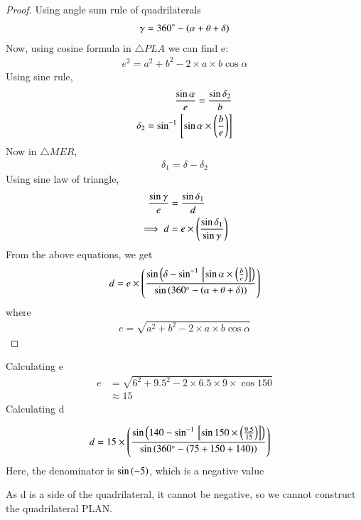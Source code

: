 \documentclass[journal,12pt,twocolumn]{IEEEtran}
\begin{document}
\begin{proof}
Using angle sum rule of quadrilaterals
\begin{align}
\gamma=360\degree-(\alpha+\theta+\delta)
\end{align}
 Now, using cosine formula in $\triangle PLA$ we can find e:
\begin{align}
 e^2=
a^2+b^2-2\times a \times b\cos{\alpha}
\end{align}
Using sine rule,
\begin{align}
    \frac{\sin{\alpha}}{e}=\frac{\sin{\delta_2}}{b}\\
    \delta_2=\sin^{-1}{}\left[\sin{\alpha}\times \left(\frac{b}{e}\right)\right]\\
\end{align}
  Now in $\triangle MER$,
  \begin{align}
  \delta_1=\delta-\delta_2
  \end{align}
Using sine law of triangle,
\begin{align}
    \frac{\sin{\gamma}}{e}&=\frac{\sin{\delta_1}}{d}\\
    \implies d&=e\times \left(\frac{\sin{\delta_1}}{\sin{\gamma}}\right)
\end{align}
From the above equations, we get
\begin{align}
d=e \times \left(\frac{\sin\left({\delta-\sin^{-1}{}\left[\sin{\alpha}\times \left(\frac{b}{e}\right)\right]}\right)}{\sin\left({360\degree-(\alpha+\theta+\delta)}\right)}\right)
\end{align}
where
\begin{align}
    e=\sqrt{a^2+b^2-2\times a \times b\cos{\alpha}}
\end{align}
\end{proof}
   
Calculating e 
\begin{align}
    e &= \sqrt{6^2 + 9.5^2 -2\times 6.5\times 9\times\cos{150}}\\
    &\approx 15
\end{align}
 Calculating d
 
 \begin{align}
     d &= 15 \times \left(\frac{\sin\left({140-\sin^{-1}{}\left[\sin{150}\times \left(\frac{9.5}{15}\right)\right]}\right)}{\sin\left({360\degree-(75+150+140)}\right)}\right)
 \end{align}
    Here, the denominator is $\sin\left({-5}\right)$, which is a negative value
    
    As d is a side of the quadrilateral, it cannot be negative, so we cannot construct the quadrilateral PLAN.
\end{document}

